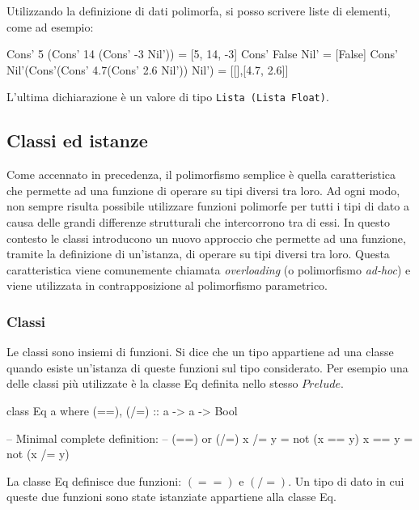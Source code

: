 Utilizzando la definizione di dati polimorfa, si posso scrivere liste di elementi, come 
ad esempio:
\begin{haskellCode}
Cons' 5 (Cons' 14 (Cons' -3 Nil'))                = [5, 14, -3]
Cons' False Nil'                                  = [False]
Cons' Nil'(Cons'(Cons' 4.7(Cons' 2.6 Nil')) Nil') = [[],[4.7, 2.6]]
\end{haskellCode}
L'ultima dichiarazione \`e un valore di tipo \verb"Lista (Lista Float)".

\subsection{Classi ed istanze}

Come accennato in precedenza, il polimorfismo semplice \`e quella caratteristica che permette ad una funzione di operare su tipi 
diversi tra loro. Ad ogni modo, non sempre risulta possibile utilizzare funzioni polimorfe per tutti i tipi di dato a causa delle grandi 
differenze strutturali che intercorrono tra di essi. In questo contesto le classi introducono un nuovo approccio che permette ad una funzione, 
tramite la definizione di un'istanza, di operare su tipi diversi tra loro. Questa caratteristica viene comunemente chiamata 
\emph{overloading} (o polimorfismo \emph{ad-hoc}) e viene utilizzata in contrapposizione al polimorfismo parametrico.

\subsubsection{Classi}
Le classi sono insiemi di funzioni. Si dice che un tipo appartiene ad una classe quando esiste un'istanza di queste funzioni sul tipo considerato. Per esempio una delle classi pi\`u utilizzate \`e la classe Eq definita nello stesso $Prelude$. 
\begin{haskellCode}
class  Eq a  where
    (==), (/=) :: a -> a -> Bool

        -- Minimal complete definition:
        --      (==) or (/=)
    x /= y     =  not (x == y)
    x == y     =  not (x /= y)
\end{haskellCode}
La classe Eq definisce due funzioni: $(==)$ e $(/=)$. Un tipo di dato in cui queste due funzioni sono state istanziate appartiene alla classe Eq.

